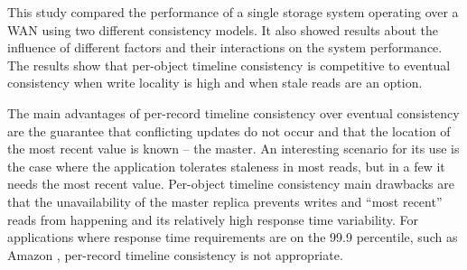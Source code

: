 \documentclass[doublespacing]{bmcart}
\begin{document}
This study compared the performance of a single storage system operating over a
WAN using two different consistency models. It also showed results
about the influence of different factors and their interactions on the system
performance. The results show that per-object timeline consistency is competitive to eventual consistency
when write locality is high and when stale reads are an option.

The main advantages of per-record timeline consistency over eventual consistency are the
guarantee that conflicting updates do not occur and that the location of the
most recent value is known -- the master. An interesting scenario for its use is
the case where the application tolerates staleness in most reads, but in a few
it needs the most recent value. Per-object timeline consistency main drawbacks are that the
unavailability of the master replica prevents writes and ``most recent'' reads from
happening and its relatively high response time variability. For applications where response time
requirements are on the 99.9 percentile, such as Amazon \cite{DeCandia2007},
per-record timeline consistency is not appropriate.

\end{document}
